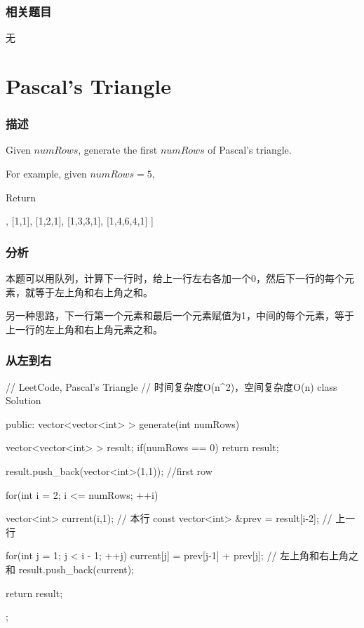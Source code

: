 \subsubsection{相关题目}

\begindot
\item 无
\myenddot


\section{Pascal's Triangle} %
\label{sec:pascals-triangle}


\subsubsection{描述}
Given $numRows$, generate the first $numRows$ of Pascal's triangle.

For example, given $numRows = 5$,

Return
\begin{Code}
[
     [1],
    [1,1],
   [1,2,1],
  [1,3,3,1],
 [1,4,6,4,1]
]
\end{Code}


\subsubsection{分析}
本题可以用队列，计算下一行时，给上一行左右各加一个0，然后下一行的每个元素，就等于左上角和右上角之和。

另一种思路，下一行第一个元素和最后一个元素赋值为1，中间的每个元素，等于上一行的左上角和右上角元素之和。


\subsubsection{从左到右}
\begin{Code}
// LeetCode, Pascal's Triangle
// 时间复杂度O(n^2)，空间复杂度O(n)
class Solution {
public:
    vector<vector<int> > generate(int numRows) {
        vector<vector<int> > result;
        if(numRows == 0) return result;

        result.push_back(vector<int>(1,1)); //first row

        for(int i = 2; i <= numRows; ++i) {
            vector<int> current(i,1);  // 本行
            const vector<int> &prev = result[i-2];  // 上一行

            for(int j = 1; j < i - 1; ++j) {
                current[j] = prev[j-1] + prev[j]; // 左上角和右上角之和
            }
            result.push_back(current);
        }
        return result;
    }
};
\end{Code}


